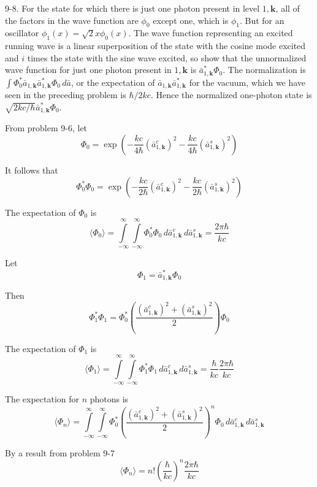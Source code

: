 \documentclass[12pt]{article}
\begin{document}
9-8.
For the state for which there is just one photon
present in level $1,\mathbf k$, all of the factors in the wave function are
$\phi_0$ except one, which is $\phi_1$.
But for an oscillator $\phi_1(x)=\sqrt2x\phi_0(x)$.
The wave function representing an excited running wave is a linear
superposition of the state with the cosine mode excited and $i$
times the state with the sine wave excited, so show that the
unnormalized wave function for just one photon present in
$1,\mathbf k$ is $\bar a_{1,\mathbf k}^*\Phi_0$.
The normalization is
$\int\Phi_0^*\bar a_{1,\mathbf k}\bar a_{1,\mathbf k}^*\Phi_0\,d\bar a$,
or the expectation of $\bar a_{1,\mathbf k}\bar a_{1,\mathbf k}^*$ for the
vacuum, which we have seen in the preceding problem is $\hbar/2kc$.
Hence the normalized one-photon state is
$\sqrt{2kc/\hbar}\bar a_{1,\mathbf k}^*\Phi_0$.

\bigskip
From problem 9-6, let
\begin{equation*}
\Phi_0=\exp\left(-\frac{kc}{4\hbar}(\bar a_{1,\mathbf k}^c)^2-\frac{kc}{4\hbar}(\bar a_{1,\mathbf k}^s)^2\right)
\end{equation*}

It follows that
\begin{equation*}
\Phi_0^*\Phi_0=\exp\left(-\frac{kc}{2\hbar}(\bar a_{1,\mathbf k}^c)^2-\frac{kc}{2\hbar}(\bar a_{1,\mathbf k}^s)^2\right)
\end{equation*}

The expectation of $\Phi_0$ is
\begin{equation*}
\langle\Phi_0\rangle=
\int\limits_{-\infty}^\infty
\int\limits_{-\infty}^\infty
\Phi_0^*\Phi_0
\,d\bar a_{1,\mathbf k}^c\,d\bar a_{1,\mathbf k}^s=\frac{2\pi\hbar}{kc}
\tag{1}
\end{equation*}

Let
\begin{equation*}
\Phi_1=\bar a_{1,\mathbf k}^*\Phi_0
\end{equation*}

Then
\begin{equation*}
\Phi_1^*\Phi_1=\Phi_0^*\left(\frac{(\bar a_{1,\mathbf k}^c)^2+(\bar a_{1,\mathbf k}^s)^2}{2}\right)\Phi_0
\end{equation*}

The expectation of $\Phi_1$ is
\begin{equation*}
\langle\Phi_1\rangle=
\int\limits_{-\infty}^\infty
\int\limits_{-\infty}^\infty
\Phi_1^*\Phi_1
\,d\bar a_{1,\mathbf k}^c\,d\bar a_{1,\mathbf k}^s
=\frac{\hbar}{kc}\frac{2\pi\hbar}{kc}
\tag{2}
\end{equation*}

The expectation for $n$ photons is
\begin{equation*}
\langle\Phi_n\rangle=
\int\limits_{-\infty}^\infty
\int\limits_{-\infty}^\infty
\Phi_0^*\left(\frac{(\bar a_{1,\mathbf k}^c)^2+(\bar a_{1,\mathbf k}^s)^2}{2}\right)^n\Phi_0
\,d\bar a_{1,\mathbf k}^c\,d\bar a_{1,\mathbf k}^s
\end{equation*}

By a result from problem 9-7
\begin{equation*}
\langle\Phi_n\rangle=n!\left(\frac{\hbar}{kc}\right)^n\frac{2\pi\hbar}{kc}
\tag{3}
\end{equation*}
\end{document}
